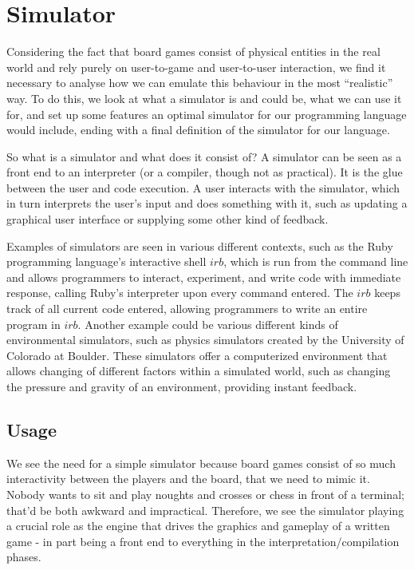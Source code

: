 \section{Simulator}
Considering the fact that board games consist of physical entities
in the real world and rely purely on user-to-game and user-to-user
interaction, we find it necessary to analyse how we can emulate this
behaviour in the most ``realistic'' way. To do this, we look at what
a simulator is and could be, what we can use it for, and set
up some features an optimal simulator for our programming language
would include, ending with a final definition of the simulator for our
language.

So what is a simulator and what does it consist of? A simulator can
be seen as a front end to an interpreter (or a compiler, though not
as practical). It is the glue between the user and code
execution. A user interacts with the simulator, which in turn interprets
the user's input and does something with it, such as updating a
graphical user interface or supplying some other kind of feedback.

Examples of simulators are seen in various different contexts, such
as the Ruby\cite{rubyLang} programming language's interactive shell
$irb$, which is run from the command line and allows programmers to
interact, experiment, and write code with immediate response, calling
Ruby's interpreter upon every command entered. The $irb$ keeps track
of all current code entered, allowing programmers to write an entire
program in $irb$. Another example could be various different kinds of
environmental simulators, such as physics simulators created by the
University of Colorado at Boulder\cite{colSim}. These simulators offer
a computerized environment that allows changing of different factors
within a simulated world, such as changing the pressure and gravity of
an environment, providing instant feedback.

\subsection{Usage}
We see the need for a simple simulator because board games consist of so
much interactivity between the players and the board, that we need to
mimic it. Nobody wants to sit and play noughts and crosses or chess in
front of a terminal; that'd be both awkward and impractical. Therefore,
we see the simulator playing a crucial role as the engine that drives
the graphics and gameplay of a written game - in part being a front end
to everything in the interpretation/compilation phases.

